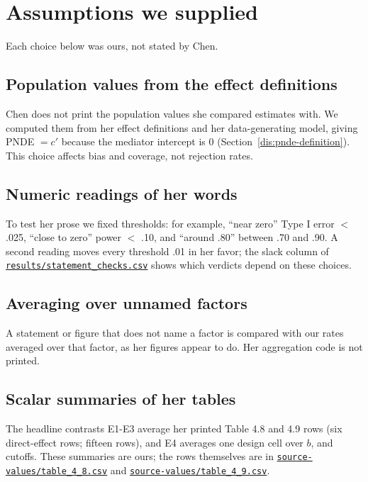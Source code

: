 \section{Assumptions we supplied}\label{sec:assumptions}

Each choice below was ours, not stated by Chen.

\subsection{Population values from the effect definitions}\label{sec:ass-pop}
Chen does not print the population values she compared estimates with. We computed them from her effect definitions and her data-generating model, giving PNDE $= c'$ because the mediator intercept is 0 (Section~\ref{dis:pnde-definition}). This choice affects bias and coverage, not rejection rates.

\subsection{Numeric readings of her words}\label{sec:ass-words}
To test her prose we fixed thresholds: for example, ``near zero'' Type I error $<$ .025, ``close to zero'' power $<$ .10, and ``around .80'' between .70 and .90. A second reading moves every threshold .01 in her favor; the slack column of \href{https://github.com/alectionary/vibe-math/blob/master/formalization/chen-rdd-mediation/results/statement_checks.csv}{\nolinkurl{results/statement_checks.csv}} shows which verdicts depend on these choices.

\subsection{Averaging over unnamed factors}\label{sec:ass-avg}
A statement or figure that does not name a factor is compared with our rates averaged over that factor, as her figures appear to do. Her aggregation code is not printed.

\subsection{Scalar summaries of her tables}\label{sec:ass-contrasts}
The headline contrasts E1-E3 average her printed Table 4.8 and 4.9 rows (six direct-effect rows; fifteen rows), and E4 averages one design cell over $b$, \cp{} and cutoffs. These summaries are ours; the rows themselves are in \href{https://github.com/alectionary/vibe-math/blob/master/formalization/chen-rdd-mediation/source-values/table_4_8.csv}{\nolinkurl{source-values/table_4_8.csv}} and \href{https://github.com/alectionary/vibe-math/blob/master/formalization/chen-rdd-mediation/source-values/table_4_9.csv}{\nolinkurl{source-values/table_4_9.csv}}.

